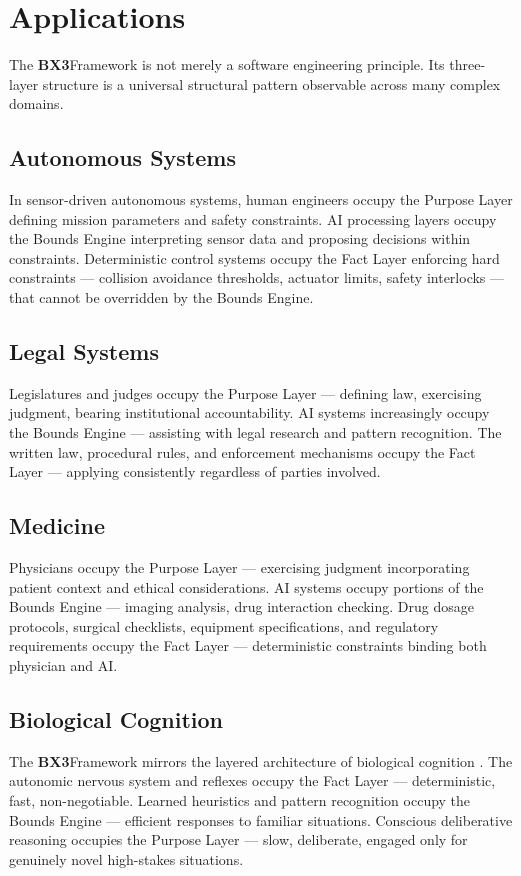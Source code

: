 \documentclass[12pt]{article}
\newcommand{\bxthree}{\textbf{BX3}}
\begin{document}
\section{Applications}
\label{sec:applications}

The \bxthree Framework is not merely a software engineering principle. Its three-layer structure is a universal structural pattern observable across many complex domains.

\subsection{Autonomous Systems}
In sensor-driven autonomous systems, human engineers occupy the Purpose Layer defining mission parameters and safety constraints. AI processing layers occupy the Bounds Engine interpreting sensor data and proposing decisions within constraints. Deterministic control systems occupy the Fact Layer enforcing hard constraints --- collision avoidance thresholds, actuator limits, safety interlocks --- that cannot be overridden by the Bounds Engine.

\subsection{Legal Systems}
Legislatures and judges occupy the Purpose Layer --- defining law, exercising judgment, bearing institutional accountability. AI systems increasingly occupy the Bounds Engine --- assisting with legal research and pattern recognition. The written law, procedural rules, and enforcement mechanisms occupy the Fact Layer --- applying consistently regardless of parties involved.

\subsection{Medicine}
Physicians occupy the Purpose Layer --- exercising judgment incorporating patient context and ethical considerations. AI systems occupy portions of the Bounds Engine --- imaging analysis, drug interaction checking. Drug dosage protocols, surgical checklists, equipment specifications, and regulatory requirements occupy the Fact Layer --- deterministic constraints binding both physician and AI.

\subsection{Biological Cognition}
The \bxthree Framework mirrors the layered architecture of biological cognition \cite{kahneman2011}. The autonomic nervous system and reflexes occupy the Fact Layer --- deterministic, fast, non-negotiable. Learned heuristics and pattern recognition occupy the Bounds Engine --- efficient responses to familiar situations. Conscious deliberative reasoning occupies the Purpose Layer --- slow, deliberate, engaged only for genuinely novel high-stakes situations.
\end{document}
